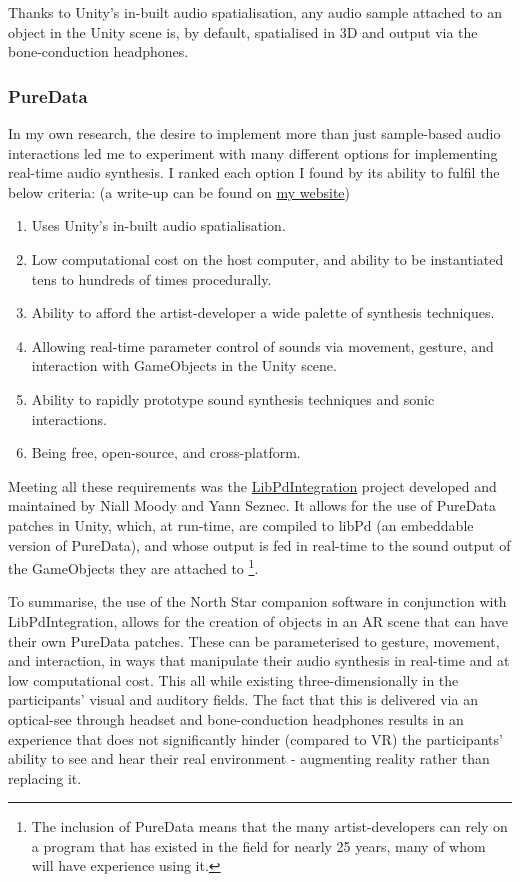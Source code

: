 Thanks to Unity’s in-built audio spatialisation, any audio sample attached to an object in the Unity scene is, by default, spatialised in 3D and output via the bone-conduction headphones.

\subsubsection{PureData}\label{sec: polaris-framework-software-puredata}
In my own research, the desire to implement more than just sample-based audio interactions led me to experiment with many different options for implementing real-time audio synthesis. I ranked each option I found by its ability to fulfil the below criteria: (a write-up can be found on \href{https://sambilbow.com/projects/polaris/software.html}{my website})

\begin{enumerate}
    \item Uses Unity’s in-built audio spatialisation.
    \item Low computational cost on the host computer, and ability to be instantiated tens to hundreds of times procedurally.
    \item Ability to afford the artist-developer a wide palette of synthesis techniques.
    \item Allowing real-time parameter control of sounds via movement, gesture, and interaction with GameObjects in the Unity scene.
    \item Ability to rapidly prototype sound synthesis techniques and sonic interactions.
    \item Being free, open-source, and cross-platform.
\end{enumerate}

Meeting all these requirements was the \href{https://github.com/LibPdIntegration/LibPdIntegration}{LibPdIntegration} project developed and maintained by Niall Moody and Yann Seznec. It allows for the use of PureData patches in Unity, which, at run-time, are compiled to libPd (an embeddable version of PureData), and whose output is fed in real-time to the sound output of the GameObjects they are attached to  \footnote{The inclusion of PureData means that the many artist-developers can rely on a program that has existed in the field for nearly 25 years, many of whom will have experience using it.}.

To summarise, the use of the North Star companion software in conjunction with LibPdIntegration, allows for the creation of objects in an AR scene that can have their own PureData patches. These can be parameterised to gesture, movement, and interaction, in ways that manipulate their audio synthesis in real-time and at low computational cost. This all while existing three-dimensionally in the participants’ visual and auditory fields. The fact that this is delivered via an optical-see through headset and bone-conduction headphones results in an experience that does not significantly hinder (compared to VR) the participants’ ability to see and hear their real environment - augmenting reality rather than replacing it.



